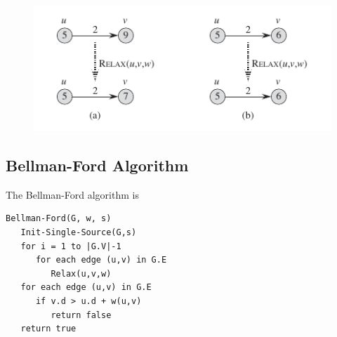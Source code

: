 \begin{figure}[H]
\centering
\includegraphics[scale=0.65]{images/sssp_4.png}
\end{figure}



\subsection{Bellman-Ford Algorithm}

The Bellman-Ford algorithm is

\begin{verbatim}
Bellman-Ford(G, w, s)
   Init-Single-Source(G,s)
   for i = 1 to |G.V|-1
      for each edge (u,v) in G.E
         Relax(u,v,w)
   for each edge (u,v) in G.E
      if v.d > u.d + w(u,v)
         return false
   return true
\end{verbatim}





